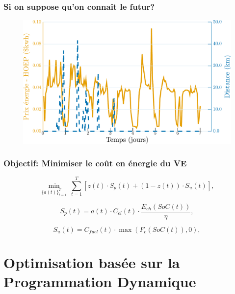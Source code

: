 \documentclass[french]{beamer}
\begin{document}
{\begin{frame}
\frametitle{Si on suppose qu'on connaît le futur?}
\begin{center}
\begin{figure}
\includegraphics[width=\linewidth]{PriceDist_201Fr.pdf}
\end{figure} 
 \end{center}
\end{frame}





\begin{frame}
\frametitle{Objectif: Minimiser le coût en énergie du VE}
\begin{center}
\begin{equation}
\min_{\{a(t)\}_{t=1}^T}~\sum_{t=1}^{T} \left[z(t) \cdot S_p(t) + (1-z(t)) \cdot S_u(t)\right],
\label{eq:cost}
\end{equation}


\begin{equation}\label{eq:costp1}
S_p(t) = a(t) \cdot C_{el}(t) \cdot \frac{E_{ch}(SoC(t))}{\eta},
\end{equation}


\begin{equation}\label{eq:costp2}
S_u(t) = C_{fuel}(t) \cdot \max(F_{c}(SoC(t)),0),
\end{equation}
\end{center}
\end{frame}






\section{Optimisation basée sur la Programmation Dynamique}
}
\end{document}
